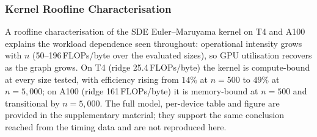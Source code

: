 \documentclass{ieeeaccess}
\begin{document}
\begin{table}[!t]
\caption{Single-GPU MLMC runtime on A100 80\,GB PCIe (BA($n$,\,$m{=}3$) graph,
post-warmup).  Left block: $\varepsilon{=}0.05$ large-$n$ sweep
(Claim~1: efficiency recovery). Right block: $n{=}1{,}000$ tight-$\varepsilon$ sweep
(Claim~2: $\mathcal{O}(\varepsilon^{-2})$ slope). Peak memory shown in GB.}
\label{tab:large_scale}
\centering\small
{}
\end{table}

\subsubsection{Kernel Roofline Characterisation}
\label{subsec:roofline}

A roofline characterisation of the SDE Euler--Maruyama kernel on T4 and A100 explains the
workload dependence seen throughout: operational intensity grows with $n$ (50--196\,FLOPs/byte
over the evaluated sizes), so GPU utilisation recovers as the graph grows. On T4 (ridge
25.4\,FLOPs/byte) the kernel is compute-bound at every size tested, with efficiency rising from
$14\%$ at $n{=}500$ to $49\%$ at $n{=}5{,}000$; on A100 (ridge 161\,FLOPs/byte) it is
memory-bound at $n{=}500$ and transitional by $n{=}5{,}000$. The full model, per-device table
and figure are provided in the supplementary material; they support the same conclusion reached
from the timing data and are not reproduced here.
\end{document}
